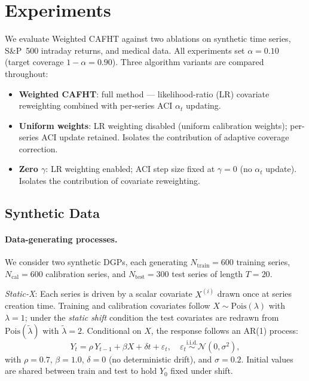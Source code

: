 %



\section{Experiments}
\label{sec:experiments}

We evaluate Weighted CAFHT against two ablations on synthetic time series, S\&P~500 intraday returns, and medical data. All experiments set $\alpha = 0.10$ (target
coverage $1 - \alpha = 0.90$). Three algorithm variants are compared
throughout:
%
\begin{itemize}[nosep]
  \item \textbf{Weighted CAFHT}: full method — likelihood-ratio (LR) covariate
        reweighting combined with per-series ACI $\alpha_t$ updating.
  \item \textbf{Uniform weights}: LR weighting disabled (uniform calibration
        weights); per-series ACI update retained. Isolates the contribution of
        adaptive coverage correction.
  \item \textbf{Zero $\gamma$}: LR weighting enabled; ACI step size fixed at
        $\gamma = 0$ (no $\alpha_t$ update). Isolates the contribution of
        covariate reweighting.
\end{itemize}

\subsection{Synthetic Data}
\label{sec:experiments:synthetic}

\paragraph{Data-generating processes.}
We consider two synthetic DGPs, each generating $N_{\mathrm{train}} = 600$
training series, $N_{\mathrm{cal}} = 600$ calibration series, and
$N_{\mathrm{test}} = 300$ test series of length $T = 20$.

\textit{Static-X}: Each series is driven by a scalar covariate $X^{(i)}$
drawn once at series creation time.  Training and calibration covariates
follow $X \sim \mathrm{Pois}(\lambda)$ with $\lambda = 1$; under the
\emph{static shift} condition the test covariates are redrawn from
$\mathrm{Pois}(\tilde\lambda)$ with $\tilde\lambda = 2$.  Conditional on $X$,
the response follows an AR(1) process:
%
\[
  Y_t = \rho \, Y_{t-1} + \beta X + \delta t + \varepsilon_t, \quad
  \varepsilon_t \overset{\text{i.i.d.}}{\sim} \mathcal{N}(0, \sigma^2),
\]
%
with $\rho = 0.7$, $\beta = 1.0$, $\delta = 0$ (no deterministic drift), and
$\sigma = 0.2$.  Initial values are shared between train and test to hold
$Y_0$ fixed under shift.

